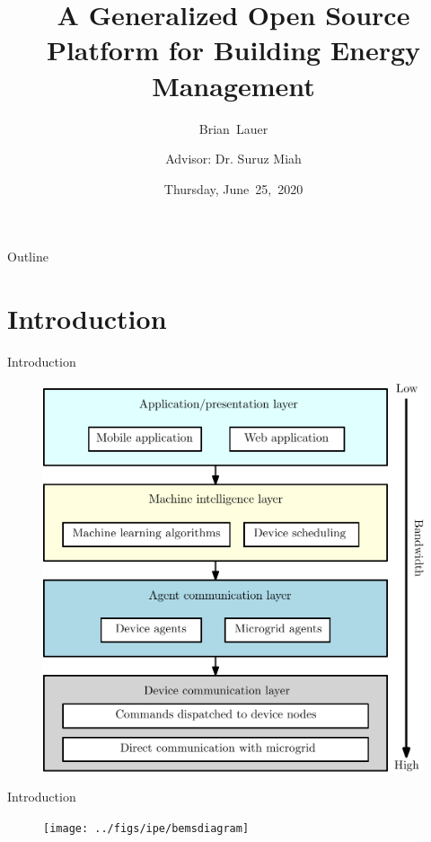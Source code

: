 \documentclass{beamer}
\title[Progress Update]{A Generalized Open Source Platform for Building Energy Management}
\author[B.~Lauer]{Brian~Lauer\\\and
Advisor: Dr. Suruz Miah}
\institute[Bradley University] %
{
  Department of Electrical and Computer Engineering\\
  Bradley University\\
  1501 W. Bradley Avenue\\
  Peoria, IL, 61625, USA
}
\date[June~25,~2020]{Thursday, June~25,~2020}
\begin{document}
\begin{frame}
  \titlepage
\end{frame}

\begin{frame}{Outline}
  \tableofcontents
\end{frame}
\section{Introduction}

\begin{frame}{Introduction}{}
  \begin{figure}
  \includegraphics[scale=0.35]{../figs/ipe/BEMS-softwareArchitecture}
  \end{figure}
\end{frame}

\begin{frame}{Introduction}{}
  \begin{figure}
  \texttt{[image: ../figs/ipe/bemsdiagram]}
  \end{figure}
\end{frame}
\end{document}
